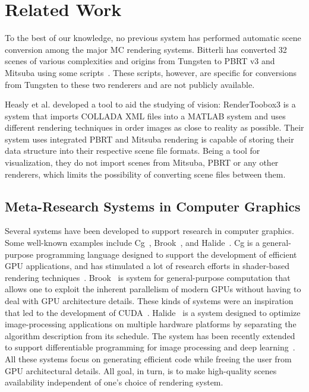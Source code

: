 \section{Related Work}
\label{(sec:related_work)}

To the best of our knowledge, no previous system has performed automatic scene conversion among the major MC rendering systems. 
Bitterli has converted 32 scenes of various complexities and origins from Tungsten to PBRT v3 and Mitsuba using some scripts~\cite{tungsten}. These scripts, however, are specific for conversions from Tungsten to these two renderers and are not publicly available. 

Heasly et al. developed a tool to aid the studying of vision: RenderToobox3 \cite{rendertoolbox} is a system that imports COLLADA XML files into a MATLAB system and uses different rendering techniques in order images as close to reality as possible. Their system uses integrated PBRT and Mitsuba rendering is capable of storing their data structure into their respective scene file formats. Being a tool for visualization, they do not import scenes from Mitsuba, PBRT or any other renderers, which limits the possibility of converting scene files between them. 

\subsection{Meta-Research Systems in Computer Graphics}

Several systems have been developed to support research in computer graphics. 
Some well-known examples include Cg~\cite{Mark2003}, Brook~\cite{Buck2004}, and Halide~\cite{Ragan-Kelley2012}.
Cg is a general-purpose programming language designed to support the development of efficient GPU applications, and has stimulated a lot of research efforts in shader-based rendering techniques~\cite{Policarpo2005, Policarpo2006, Wyman2005, Oliveira2007RRT}.  
Brook~\cite{Buck2004} is system for general-purpose computation that allows one to exploit the inherent parallelism of modern GPUs without having to deal with GPU architecture details. These kinds of systems were an inspiration that led to the development of CUDA~\cite{Nickolls2008}.
Halide~\cite{Ragan-Kelley2012} is a system designed to optimize image-processing applications on multiple hardware platforms by separating the algorithm description from its schedule. The system has been recently extended to support differentiable programming for image processing and deep learning~\cite{Li2018-Halide-Diff_Prog}. All these systems focus on generating efficient code while freeing the user from GPU architectural details. All goal, in turn, is to make high-quality scenes availability independent of one's choice of rendering system. 

